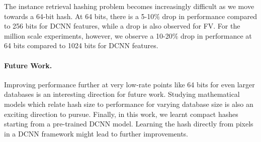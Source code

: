 \documentclass[10pt,twocolumn,letterpaper]{article}
\begin{document}
The instance retrieval hashing problem becomes increasingly difficult as we move towards a 64-bit hash.
At 64 bits, there is a 5-10$\%$ drop in performance compared to 256 bits for DCNN features, while a drop is also observed for FV.
For the million scale experiments, however, we observe a 10-20$\%$ drop in performance at 64 bits compared to 1024 bits for DCNN features.

\vspace{-0.1em}
\paragraph{Future Work.} Improving performance further at very low-rate points like 64 bits for even larger databases is an interesting direction for future work.
Studying mathematical models which relate hash size to performance for varying database size is also an exciting direction to pursue.
Finally, in this work, we learnt compact hashes starting from a pre-trained DCNN model.
Learning the hash directly from pixels in a DCNN framework might lead to further improvements.

%
%
%			
%
%
\end{document}
